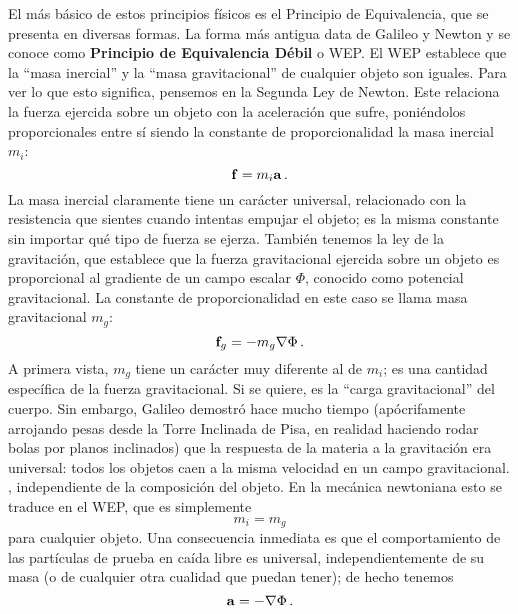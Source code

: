 \documentclass[11pt,b5paper,openany,twoside]{book}
\begin{document}
El más básico de estos principios físicos es el Principio de Equivalencia, que se presenta en diversas formas.
La forma más antigua data de Galileo y Newton y se conoce como {\bf Principio de Equivalencia Débil} o WEP.
El WEP establece que la ``masa inercial'' y la ``masa gravitacional'' de cualquier objeto son iguales.
Para ver lo que esto significa, pensemos en la Segunda Ley de Newton.
Este relaciona la fuerza ejercida sobre un objeto con la aceleración que sufre, poniéndolos proporcionales entre sí siendo la constante de proporcionalidad la masa inercial $m_i$:
\begin{equation}
{\bf f} = m_i {\bf a}\,.\label{4.1}
\end{equation}
La masa inercial claramente tiene un carácter universal, relacionado con la resistencia que sientes cuando intentas empujar el objeto; es la misma constante sin importar qué tipo de fuerza se ejerza.
También tenemos la ley de la gravitación, que establece que la fuerza gravitacional ejercida sobre un objeto es proporcional al gradiente de un campo escalar $\Phi$, conocido como potencial gravitacional.
La constante de proporcionalidad en este caso se llama masa gravitacional $m_g$:
\begin{equation}
{\bf f}_g = -m_g \nabla\Phi\,.\label{4.2}
\end{equation}
A primera vista, $m_g$ tiene un carácter muy diferente al de $m_i$; es una cantidad específica de la fuerza gravitacional.
Si se quiere, es la ``carga gravitacional'' del cuerpo.
Sin embargo, Galileo demostró hace mucho tiempo (apócrifamente arrojando pesas desde la Torre Inclinada de Pisa, en realidad haciendo rodar bolas por planos inclinados) que la respuesta de la materia a la gravitación era universal: todos los objetos caen a la misma velocidad en un campo gravitacional. , independiente de la composición del objeto.
En la mecánica newtoniana esto se traduce en el WEP, que es simplemente
\begin{equation}
m_i = m_g\label{4.3}
\end{equation}
para cualquier objeto.
Una consecuencia inmediata es que el comportamiento de las partículas de prueba en caída libre es universal, independientemente de su masa (o de cualquier otra cualidad que puedan tener); de hecho tenemos
\begin{equation}
{\bf a}= - \nabla\Phi\,.\label{4.4}
\end{equation}
\end{document}
